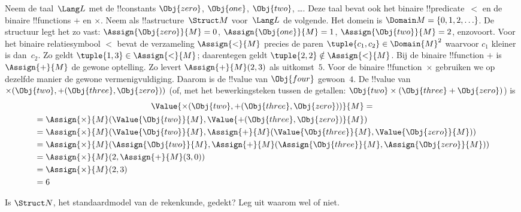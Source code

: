 \documentclass[../../../include/open-logic-section]{subfiles}
\begin{document}
\begin{ex}
Neem de taal~$\Lang L$ met de !!{constant}s $\Obj{zero}$,
$\Obj{one}$, $\Obj{two}$, \dots. Deze taal bevat ook het binaire
!!{predicate}~$<$ en de binaire !!{function}s $+$ en $\times$.
Neem als !!a{structure}~$\Struct M$ voor~$\Lang L$ de volgende. Het
domein is $\Domain M = \{0, 1, 2, \ldots \}$. De structuur legt het zo
vast: $\Assign{\Obj{zero}}{M} = 0$, $\Assign{\Obj{one}}{M} = 1$,
$\Assign{\Obj{two}}{M} = 2$, enzovoort. Voor het binaire
relatiesymbool $<$ bevat de verzameling $\Assign{<}{M}$ precies de
paren $\tuple{c_1, c_2} \in \Domain{M}^2$ waarvoor $c_1$ kleiner is
dan~$c_2$. Zo geldt $\tuple{1, 3} \in \Assign{<}{M}$; daarentegen
geldt $\tuple{2, 2} \notin \Assign{<}{M}$. Bij de
binaire !!{function} $+$ is $\Assign{+}{M}$ de gewone optelling. Zo
levert $\Assign{+}{M}(2,3)$ als uitkomst~$5$. Voor de binaire
!!{function}~$\times$ gebruiken we op dezelfde manier de gewone
vermenigvuldiging. Daarom is de !!{value} van $\Obj{four}$ gewoon~$4$.
De !!{value} van $\times(\Obj{two},
+(\Obj{three},\Obj{zero}))$ (of, met het bewerkingsteken tussen de
getallen: $\Obj{two} \times (\Obj{three} + \Obj{zero})$) is
\begin{multline*}
\Value{\times(\Obj{two}, +(\Obj{three},\Obj{zero}))}{M} =\\
\begin{aligned}
& =\Assign{\times}{M}(\Value{\Obj{two}}{M}, \Value{+(\Obj{three}, \Obj{zero})}{M})\\
& = \Assign{\times}{M}(\Value{\Obj{two}}{M}, \Assign{+}{M}(\Value{\Obj{three}}{M},
\Value{\Obj{zero}}{M})) \\
& = \Assign{\times}{M}(\Assign{\Obj{two}}{M}, \Assign{+}{M}(\Assign{\Obj{three}}{M},
\Assign{\Obj{zero}}{M})) \\
& = \Assign{\times}{M}(2, \Assign{+}{M}(3, 0)) \\
& = \Assign{\times}{M}(2, 3) \\
& = 6
\end{aligned}
\end{multline*}
\end{ex}

\begin{prob}
Is $\Struct N$, het standaardmodel van de rekenkunde, gedekt? Leg uit
waarom wel of niet.
\end{prob}
\end{document}
